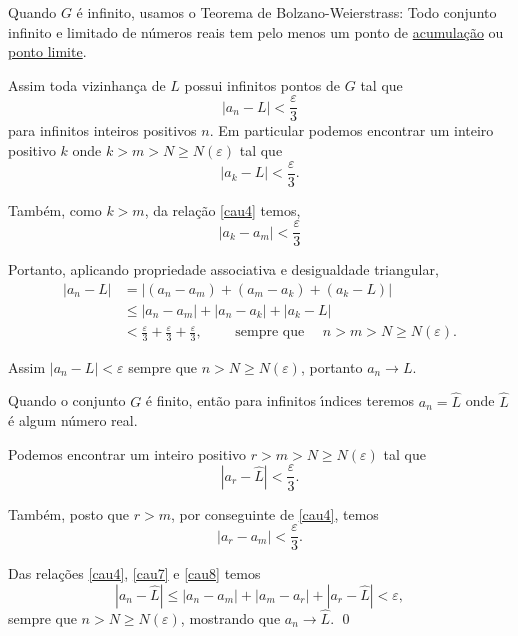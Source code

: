 Quando $G$ \'{e} infinito, usamos o Teorema de Bolzano-Weierstrass: Todo
conjunto infinito e limitado de n\'{u}meros reais tem pelo menos um ponto
de \underline{acumula\c{c}\~{a}o} ou \underline{ponto limite}.

Assim toda vizinhan\c{c}a de $L$ possui infinitos pontos de $G$ tal que
\begin{equation*}
    |a_n-L|<\frac{\varepsilon}{3}
\end{equation*}
para infinitos inteiros positivos $n$. Em particular podemos
encontrar um inteiro positivo $k$ onde $k>m>N\geq N(\varepsilon)$ tal que
\begin{equation}\label{cau5}
    |a_k-L|<\frac{\varepsilon}{3}.
\end{equation}

Tamb\'{e}m, como $k>m$, da rela\c{c}\~{a}o \eqref{cau4} temos,
\begin{equation}\label{cau6}
    |a_k-a_m|<\frac{\varepsilon}{3}
\end{equation}

Portanto, aplicando propriedade associativa e desigualdade
triangular,
\begin{align*}
    |a_n-L|&=|(a_n-a_m)+(a_m-a_k)+(a_k-L)|\\[2ex]
    &\leq |a_n-a_m|+|a_n-a_k|+|a_k-L|\\[2ex]
    &<\frac{\varepsilon}{3}+\frac{\varepsilon}{3}+\frac{\varepsilon}{3},\qquad\text{ sempre que
    }\quad n>m>N\geq N(\varepsilon).
\end{align*}

Assim $|a_n-L|<\varepsilon$ sempre que $n>N\geq N(\varepsilon)$, portanto $a_n\to L$.

Quando o conjunto $G$ \'{e} finito, ent\~{a}o para infinitos \'{\i}ndices teremos
$a_n=\hat{L}$ onde $\hat{L}$ \'{e} algum n\'{u}mero real.

Podemos encontrar um inteiro positivo $r>m>N\geq N(\varepsilon)$ tal que
\begin{equation}\label{cau7}
    |a_r-\hat{L}|<\frac{\varepsilon}{3}.
\end{equation}

Tamb\'{e}m, posto que $r>m$, por conseguinte de \eqref{cau4}, temos
\begin{equation}\label{cau8}
    |a_r-a_m|<\frac{\varepsilon}{3}.
\end{equation}

Das rela\c{c}\~{o}es \eqref{cau4}, \eqref{cau7} e \eqref{cau8} temos
\begin{equation*}
    |a_n-\hat{L}|\leq |a_n-a_m|+|a_m-a_r|+|a_r-\hat{L}|<\varepsilon,
\end{equation*}
sempre que $n>N\geq N(\varepsilon)$, mostrando que $a_n\to\hat{L}$. \qed

